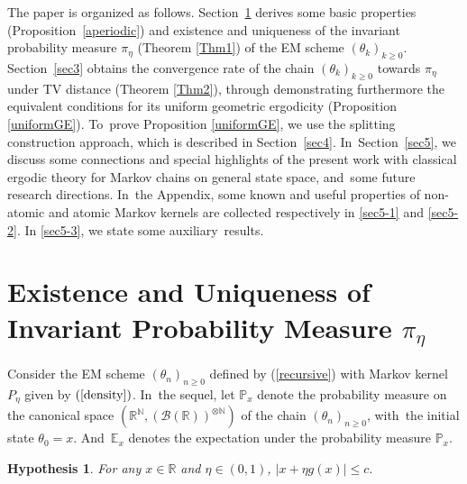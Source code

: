 \documentclass[11pt]{elsarticle}
\def\geq{\geqslant}
\def\leq{\leqslant}
\def\P{\mathbb{P}}
\def\E{\mathbb{E}}
\def\N{\mathbb{N}}
\def\R{\mathbb{R}}
\newtheorem{hyp}{Hypothesis}
\begin{document}
The paper is organized as follows. Section~\ref{sec2} derives some basic properties (Proposition~\ref{aperiodic}) and existence and uniqueness of the invariant probability measure $\pi_{\eta}$ (Theorem \ref{Thm1}) of the EM scheme $(\theta_k)_{k\geq0}$. Section~\ref{sec3} obtains the convergence rate of the chain $(\theta_k)_{k\geq0}$ towards $\pi_{\eta}$ under TV distance (Theorem \ref{Thm2}), through demonstrating furthermore the equivalent conditions for its uniform geometric ergodicity (Proposition \ref{uniformGE}).  To~prove Proposition  \ref{uniformGE}, we use the splitting construction approach, which is described in Section~\ref{sec4}. In~Section~\ref{sec5}, we discuss some connections and special highlights of the present work with classical ergodic theory for Markov chains on general state space, and~some future research directions. In~the Appendix, some known and useful properties of non-atomic and atomic Markov kernels are collected respectively in
\ref{sec5-1} and \ref{sec5-2}. In \ref{sec5-3}, we state some auxiliary~results.
\section{Existence and Uniqueness of Invariant Probability Measure $ \pi_ \eta$}\label{sec2}
Consider the EM scheme $(\theta_n)_{n\geq0}$ defined by (\ref{recursive}) with Markov kernel $P_{\eta}$ given by $(\ref{density})$. In~the sequel, let $\P_x$ denote the probability measure on the canonical space $\left(\R^{\N},\left(\mathcal{B}(\R)\right)^{\otimes\N}\right)$ of the chain $(\theta_n)_{n\geq0}$, with~the initial state $\theta_0=x$. And~$\E_x$ denotes the expectation under the probability measure $\P_x$. 

\begin{hyp}\label{hyp2}\label{assump2}
	For any $x\in\R$ and $\eta\in(0,1)$, $|x+\eta g(x)|\leq c.$
\end{hyp}
\end{document}
